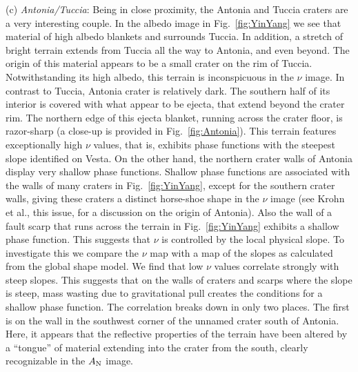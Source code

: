 \documentclass[3p,authoryear]{elsarticle}
\begin{document}
(c) {\it Antonia/Tuccia}: Being in close proximity, the Antonia and Tuccia craters are a very interesting couple. In the albedo image in Fig.~\ref{fig:YinYang} we see that material of high albedo blankets and surrounds Tuccia. In addition, a stretch of bright terrain extends from Tuccia all the way to Antonia, and even beyond. The origin of this material appears to be a small crater on the rim of Tuccia. Notwithstanding its high albedo, this terrain is inconspicuous in the $\nu$ image. In contrast to Tuccia, Antonia crater is relatively dark. The southern half of its interior is covered with what appear to be ejecta, that extend beyond the crater rim. The northern edge of this ejecta blanket, running across the crater floor, is razor-sharp (a close-up is provided in Fig.~\ref{fig:Antonia}). This terrain features exceptionally high $\nu$ values, that is, exhibits phase functions with the steepest slope identified on Vesta. On the other hand, the northern crater walls of Antonia display very shallow phase functions. Shallow phase functions are associated with the walls of many craters in Fig.~\ref{fig:YinYang}, except for the southern crater walls, giving these craters a distinct horse-shoe shape in the $\nu$ image (see Krohn et al., this issue, for a discussion on the origin of Antonia). Also the wall of a fault scarp that runs across the terrain in Fig.~\ref{fig:YinYang} exhibits a shallow phase function. This suggests that $\nu$ is controlled by the local physical slope. To investigate this we compare the $\nu$ map with a map of the slopes as calculated from the global shape model. We find that low $\nu$ values correlate strongly with steep slopes. This suggests that on the walls of craters and scarps where the slope is steep, mass wasting due to gravitational pull creates the conditions for a shallow phase function. The correlation breaks down in only two places. The first is on the wall in the southwest corner of the unnamed crater south of Antonia. Here, it appears that the reflective properties of the terrain have been altered by a ``tongue'' of material extending into the crater from the south, clearly recognizable in the $A_{\rm N}$ image.
\end{document}
